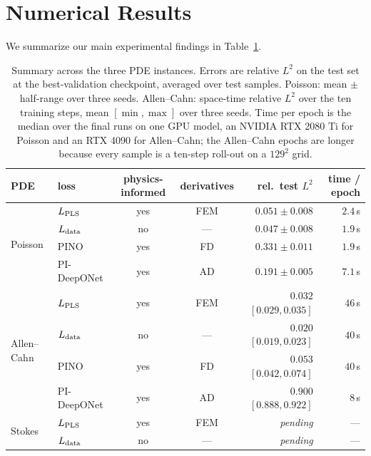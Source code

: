 \documentclass{article} %
\begin{document}
\section{Numerical Results}

We summarize our main experimental findings in Table~\ref{tab:summary}.

\begin{table}[t]
  \caption{Summary across the three PDE instances. Errors are relative $L^2$ on the test
  set at the best-validation checkpoint, averaged over test samples. Poisson: mean $\pm$
  half-range over three seeds. Allen--Cahn: space-time relative $L^2$ over the ten training
  steps, mean $[\min, \max]$ over three seeds. Time per epoch is the median over the final runs on one GPU model, an NVIDIA RTX 2080 Ti for Poisson and an RTX 4090 for Allen--Cahn; the Allen--Cahn epochs are longer because every sample is a ten-step roll-out on a $129^2$ grid.}
  \label{tab:summary}
  \centering
  \footnotesize
  \begin{tabular}{llccr r}
    \toprule
    PDE & loss & physics-informed & derivatives & rel.\ test $L^2$ & time / epoch \\
    \midrule
    \midrule
    \multirow{4}{*}{Poisson}
      & $L_\textup{PLS}$ & yes & FEM & $0.051 \pm 0.008$ & $2.4$\,s \\
      & $L_\textup{data}$ & no & --- & $0.047 \pm 0.008$ & $1.9$\,s \\
      & PINO & yes & FD & $0.331 \pm 0.011$ & $1.9$\,s \\
      & PI-DeepONet & yes & AD & $0.191 \pm 0.005$ & $7.1$\,s \\
    \midrule
    \multirow{4}{*}{Allen--Cahn}
      & $L_\textup{PLS}$ & yes & FEM & $0.032$ $[0.029, 0.035]$ & $46$\,s \\
      & $L_\textup{data}$ & no & --- & $0.020$ $[0.019, 0.023]$ & $40$\,s \\
      & PINO & yes & FD & $0.053$ $[0.042, 0.074]$ & $40$\,s \\
      & PI-DeepONet & yes & AD & $0.900$ $[0.888, 0.922]$ & $8$\,s \\
    \midrule
    \multirow{2}{*}{Stokes}
      & $L_\textup{PLS}$ & yes & FEM & \textit{pending} & --- \\
      & $L_\textup{data}$ & no & --- & \textit{pending} & --- \\
    \bottomrule
  \end{tabular}
\end{table}
\end{document}
